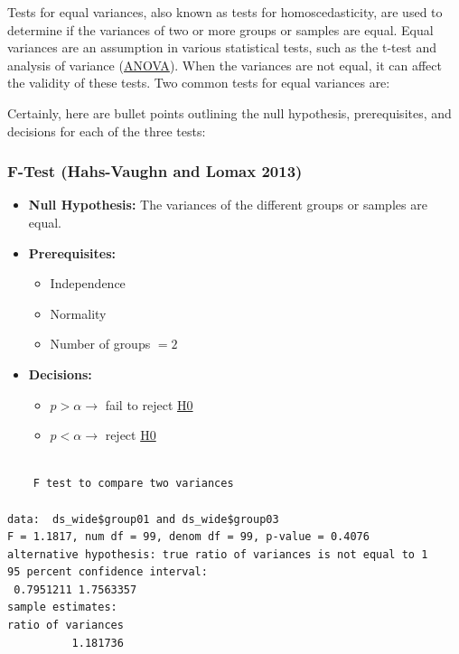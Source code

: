 \documentclass[
  a4paper,
]{scrbook}
\providecommand{\tightlist}{%
  \setlength{\itemsep}{0pt}\setlength{\parskip}{0pt}}\usepackage{longtable,booktabs,array}
\begin{document}
Tests for equal variances, also known as tests for homoscedasticity, are
used to determine if the variances of two or more groups or samples are
equal. Equal variances are an assumption in various statistical tests,
such as the t-test and analysis of variance (\hyperref[anova]{ANOVA}).
When the variances are not equal, it can affect the validity of these
tests. Two common tests for equal variances are:

Certainly, here are bullet points outlining the null hypothesis,
prerequisites, and decisions for each of the three tests:

\subsubsection{F-Test (Hahs-Vaughn and Lomax 2013)}\label{sec-f-test}

\begin{itemize}
\tightlist
\item
  \textbf{Null Hypothesis:} The variances of the different groups or
  samples are equal.
\item
  \textbf{Prerequisites:}

  \begin{itemize}
  \tightlist
  \item
    Independence
  \item
    Normality
  \item
    Number of groups \(= 2\)
  \end{itemize}
\end{itemize}

\begin{itemize}
\tightlist
\item
  \textbf{Decisions:}

  \begin{itemize}
  \tightlist
  \item
    \(p> \alpha \rightarrow\) fail to reject \hyperref[H0]{H0}
  \item
    \(p< \alpha \rightarrow\) reject \hyperref[H0]{H0}
  \end{itemize}
\end{itemize}

\begin{verbatim}

    F test to compare two variances

data:  ds_wide$group01 and ds_wide$group03
F = 1.1817, num df = 99, denom df = 99, p-value = 0.4076
alternative hypothesis: true ratio of variances is not equal to 1
95 percent confidence interval:
 0.7951211 1.7563357
sample estimates:
ratio of variances 
          1.181736 
\end{verbatim}
\end{document}
